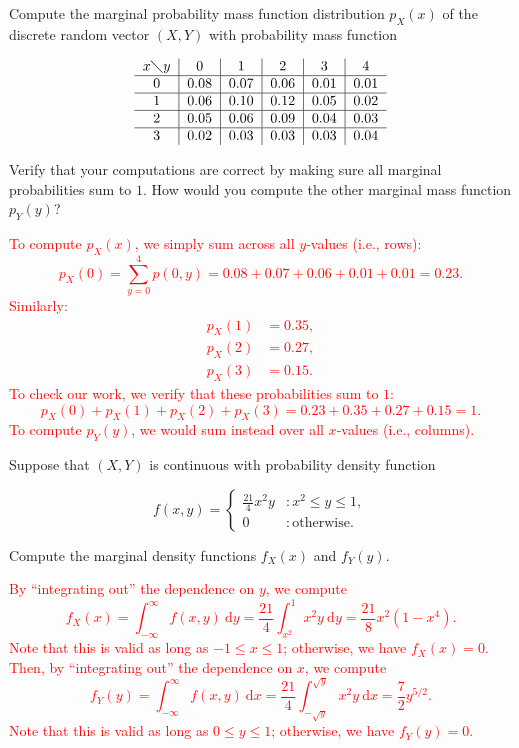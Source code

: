 \documentclass[12pt,reqno]{amsart}
\begin{document}
\prob Compute the marginal probability mass function distribution $p_X(x)$ of the discrete random vector $(X,Y)$ with probability mass function


	\[
	\begin{tabular}{c|c|c|c|c|c}
	$x \diagdown y$ & 0 & 1 & 2 & 3 & 4  \\ \hline
	0 & 0.08 & 0.07 & 0.06 & 0.01 & 0.01 \\ \hline
	1 & 0.06 & 0.10 & 0.12 & 0.05 & 0.02 \\ \hline
	2 & 0.05 & 0.06 & 0.09 & 0.04 & 0.03 \\ \hline
	3 & 0.02 & 0.03 & 0.03 & 0.03 & 0.04 
	\end{tabular}
	\]

\medskip
Verify that your computations are correct by making sure all marginal probabilities sum to $1$. How would you compute the other marginal mass function $p_Y(y)$?

\bigskip
\textcolor{red}{To compute $p_X(x)$, we simply sum across all $y$-values (i.e., rows):
	\[
	p_X(0) = \sum_{y=0}^4 p(0,y) = 0.08 + 0.07 + 0.06 + 0.01 + 0.01 = 0.23.
	\]
Similarly:
	\begin{align*}
	p_X(1) &= 0.35, \\
	p_X(2) &= 0.27, \\
	p_X(3) &= 0.15.
	\end{align*}
To check our work, we verify that these probabilities sum to $1$:
	\[
	p_X(0)+p_X(1)+p_X(2)+p_X(3) = 0.23+0.35+0.27+0.15 = 1.
	\]
To compute $p_Y(y)$, we would sum instead over all $x$-values (i.e., columns).}
\bigskip












\prob Suppose that $(X,Y)$ is continuous with probability density function

	\[
	f(x,y) = \begin{cases}
	\frac{21}{4}x^2 y & : x^2 \leq y \leq 1, \\
	0 & : \text{otherwise}.
	\end{cases}
	\]

Compute the marginal density functions $f_X(x)$ and $f_Y(y)$.

\bigskip
\textcolor{red}{By ``integrating out'' the dependence on $y$, we compute
	\[
	f_X(x) = \int_{-\infty}^\infty f(x,y) \ \text{d}y = \frac{21}{4}\int_{x^2}^1 x^2y \ \text{d}y = \frac{21}{8}x^2(1-x^4).
	\]
Note that this is valid as long as $-1 \leq x \leq 1$; otherwise, we have $f_X(x)=0$. Then, by ``integrating out'' the dependence on $x$, we compute
	\[
	f_Y(y) = \int_{-\infty}^\infty f(x,y) \ \text{d} x = \frac{21}{4} \int_{-\sqrt{y}}^{\sqrt{y}}x^2y \ \text{d} x = \frac{7}{2}y^{5/2}.
	\]
Note that this is valid as long as $0\leq y \leq 1$; otherwise, we have $f_Y(y)=0$.}
\bigskip
\end{document}
